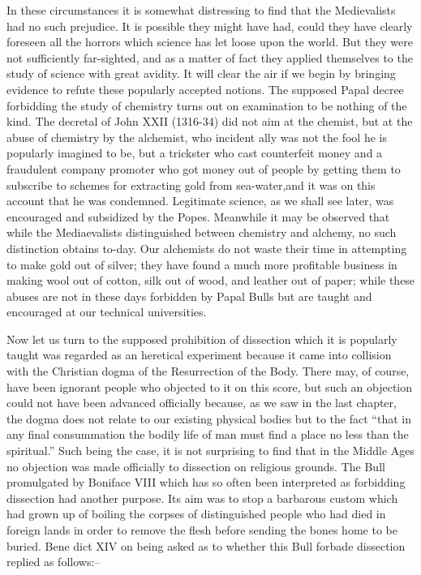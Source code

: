 \documentclass{book}
\begin{document}
In these circumstances it is somewhat distressing to find that the Medievalists had no such prejudice. It is possible they might have had, could they have clearly foreseen all the horrors which science has let loose upon the world. But they were not sufficiently far-sighted, and as a matter of fact they applied themselves to the study of science with great avidity. It will clear the air if we begin by bringing evidence to refute these popularly accepted notions. The supposed Papal decree forbidding the study of chemistry turns out on examination to be nothing of the kind. The decretal of John XXII (1316-34) did not aim at the chemist, but at the abuse of chemistry by the alchemist, who incident ally was not the fool he is popularly imagined to be, but a trickster who cast counterfeit money and a fraudulent company promoter who got money out of people by getting them to subscribe to schemes for extracting gold from sea-water,\footnotemark[1] and it was on this account that he was condemned. Legitimate science, as we shall see later, was encouraged and subsidized by the Popes. Meanwhile it may be observed that while the Mediaevalists distinguished between chemistry and alchemy, no such distinction obtains to-day. Our alchemists do not waste their time in attempting to make gold out of silver; they have found a much more profitable business in making wool out of cotton, silk out of wood, and leather out of paper; while these abuses are not in these days forbidden by Papal Bulls but are taught and encouraged at our technical universities.

Now let us turn to the supposed prohibition of dissection which it is popularly taught was regarded as an heretical experiment because it came into collision with the Christian dogma of the Resurrection of the Body. There may, of course, have been ignorant people who objected to it on this score, but such an objection could not have been advanced officially because, as we saw in the last chapter, the dogma does not relate to our existing physical bodies but to the fact “that in any final consummation the bodily life of man must find a place no less than the spiritual.” Such being the case, it is not surprising to find that in the Middle Ages no objection was made officially to dissection on religious grounds. The Bull promulgated by Boniface VIII which has so often been interpreted as forbidding dissection had another purpose. Its aim was to stop a barbarous custom which had grown up of boiling the corpses of distinguished people who had died in foreign lands in order to remove the flesh before sending the bones home to be buried. Bene dict XIV on being asked as to whether this Bull forbade dissection replied as follows:–
\end{document}
